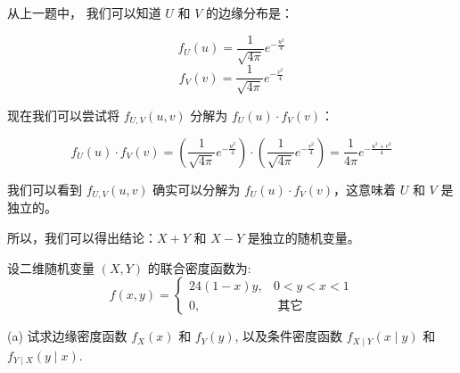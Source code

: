 \documentclass[a4,10pt]{ctexart}
\begin{document}
\begin{qj}
从上一题中，
我们可以知道 \(U\) 和 \(V\) 的边缘分布是：

\[
f_U(u) = \frac{1}{\sqrt{4\pi}} e^{-\frac{u^2}{4}}
\]
\[
f_V(v) = \frac{1}{\sqrt{4\pi}} e^{-\frac{v^2}{4}}
\]

现在我们可以尝试将 \(f_{U,V}(u, v)\) 分解为 \(f_U(u) \cdot f_V(v)\)：

\[
f_U(u) \cdot f_V(v) = \left( \frac{1}{\sqrt{4\pi}} e^{-\frac{u^2}{4}} \right) \cdot \left( \frac{1}{\sqrt{4\pi}} e^{-\frac{v^2}{4}} \right) = \frac{1}{4\pi} e^{-\frac{u^2+v^2}{4}}
\]

我们可以看到 \(f_{U,V}(u, v)\) 确实可以分解为 \(f_U(u) \cdot f_V(v)\)，这意味着 \(U\) 和 \(V\) 是独立的。

所以，我们可以得出结论：\(X+Y\) 和 \(X-Y\) 是独立的随机变量。


\end{qj}


    
    \begin{ti}{4}{}

    设二维随机变量 $(X, Y)$ 的联合密度函数为:
    \begin{equation}
    f(x, y)=\left\{\begin{array}{lc}
    24(1-x) y, & 0<y<x<1 \\
    0, & \text { 其它 }
    \end{array}\right.
   \end{equation}
\end{ti}
    (a) 试求边缘密度函数 $f_X(x)$ 和 $f_Y(y)$, 以及条件密度函数 $f_{X \mid Y}(x \mid y)$ 和 $f_{Y \mid X}(y \mid x)$.




\end{document}
